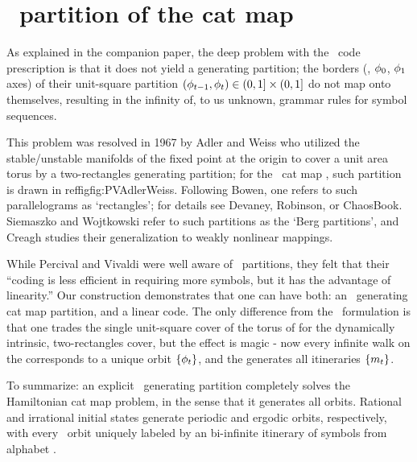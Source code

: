 
\section{\AW\ partition of the cat map \statesp}
\label{s:catMapHam}

As explained in the companion paper,
the deep problem with the \PV\ code prescription is that it does not
yield a generating partition; the borders (\ie, $\phi_0$, $\phi_1$ axes)
of their unit-square partition
$(\phi_{t-1},\phi_{t})\in(0,1]\times(0,1]$
do not map onto themselves, resulting in the infinity of, to us unknown,
grammar rules for {\inadmissible} symbol sequences.

This problem was resolved in 1967 by Adler and
Weiss who utilized the stable/\-unstable
manifolds of the fixed point at the origin to cover a unit area torus by
a two-rectangles generating partition; for the \PV\ cat map
, such partition is drawn in
 reffig{fig:PVAdlerWeiss}. Following Bowen, one refers to
such parallelograms as `rectangles'; for details
see Devaney, Robinson, or
ChaosBook. Siemaszko and Wojtkowski refer to
such partitions as the `Berg partitions', and Creagh studies
their generalization to weakly nonlinear mappings.

While Percival and Vivaldi were well aware of \AW\ partitions, they felt
that their ``coding is less efficient in requiring more symbols, but it
has the advantage of linearity.'' Our construction demonstrates that one
can have both:  an \AW\ generating cat map partition, and a linear code.
The only difference from the \PV\ formulation is that one
trades the single unit-square cover of the torus of
 for the dynamically intrinsic, two-rectangles
cover, but the effect is magic - now every
infinite walk on the {\markGraph}
corresponds to a unique {\admissible} orbit $\{\phi_{t}\}$, and the
{\markGraph} generates all {\admissible} itineraries $\{{m_{t}}\}$.

To summarize:
an explicit \AW\ generating partition completely solves the Hamiltonian cat map
problem, in the sense that it generates all {\admissible} orbits.
Rational and irrational initial states generate periodic and ergodic
orbits, respectively, with every \statesp\ orbit
uniquely labeled by an {\admissible} bi-infinite itinerary of symbols
from alphabet \A.

